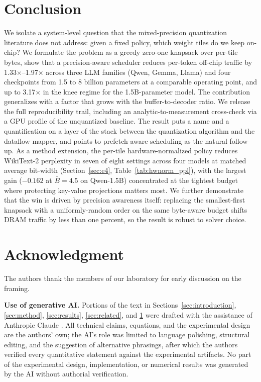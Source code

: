 \documentclass{ieeeaccess}
\begin{document}
\section{Conclusion}
\label{sec:conclusion}
We isolate a system-level question that the mixed-precision quantization
literature does not address: given a fixed policy, which weight tiles
do we keep on-chip? We formulate the problem as a greedy zero-one
knapsack over per-tile bytes, show that a precision-aware scheduler
reduces per-token off-chip traffic by 1.33$\times$--1.97$\times$ across
three LLM families (Qwen, Gemma, Llama) and four checkpoints from 1.5 to
8 billion parameters at a comparable operating point, and up to
3.17$\times$ in the knee regime for the 1.5B-parameter model. The
contribution generalizes with a factor that grows with the
buffer-to-decoder ratio. We release the full reproducibility trail, including an
analytic-to-measurement cross-check via a GPU profile of the
unquantized baseline. The result puts a name and a quantification on a
layer of the stack between the quantization algorithm and the dataflow
mapper, and points to prefetch-aware scheduling as the natural
follow-up. As a method extension, the per-tile
hardware-normalized policy reduces WikiText-2 perplexity in seven of
eight settings across four models at matched average bit-width
(Section~\ref{sec:e4}, Table~\ref{tab:hwnorm_ppl}), with the largest
gain ($-0.162$ at $\bar B = 4.5$ on Qwen-1.5B) concentrated at the
tightest budget where protecting key-value projections matters most.
We further demonstrate that the win is driven by precision awareness
itself: replacing the smallest-first knapsack with a uniformly-random
order on the same byte-aware budget shifts DRAM traffic by less than
one percent, so the result is robust to solver choice.

\section*{Acknowledgment}
The authors thank the members of our laboratory for early discussion
on the framing.

\noindent\textbf{Use of generative AI.} Portions of the text in
Sections~\ref{sec:introduction}, \ref{sec:method}, \ref{sec:results},
\ref{sec:related}, and \ref{sec:conclusion} were drafted with the
assistance of Anthropic Claude \cite{anthropic2024claude}. All
technical claims, equations, and the experimental design are the
authors' own; the AI's role was limited to language polishing,
structural editing, and the suggestion of alternative phrasings, after
which the authors verified every quantitative statement against the
experimental artifacts. No part of the experimental design,
implementation, or numerical results was generated by the AI without
authorial verification.
\end{document}
